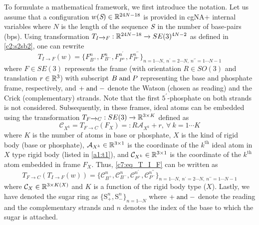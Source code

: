 To formulate a mathematical framework, we first introduce the notation. Let us assume that a configuration $w({\textit{S}}) \in {\mathbb R}^{24N-18}$ is provided in cgNA$+$ internal variables where $N$ is the length of the sequence ${\textit{S}}$ in the number of base-pairs (bps). 
Using transformation $T_{I\xrightarrow{}F} : {\mathbb R}^{24N-18}  \xrightarrow{} SE(3)^{4N-2}$ as defined in \cref{c2:s2sb2}, one can rewrite  
\begin{equation}
T_{I\xrightarrow{}F}(w) = \{F_{B^+}^n,F_{B^-}^n,F_{P^+}^{n^\prime},F_{P^-}^{n^{\prime\prime}}\}_{n=1\cdots N, \ n^\prime=2 \cdots N, \ n^{\prime\prime} = 1 \cdots N-1}
\label{c7:eq_T_I_F}
\end{equation}
where $F \in SE(3)$ represents the frame (with orientation $R \in SO(3)$ and translation $r \in {\mathbb R}^3$) with subscript $B {\;\text{and\;}} P$ representing the base and phosphate frame, respectively, and $+ {\;\text{and\;}} -$ denote the Watson (chosen as reading) and the Crick (complementary) strands.
Note that the first $5^\prime$-phosphate on both strands is not considered.
Subsequently, in these frames, ideal atoms can be embedded using the transformation $T_{F\xrightarrow{}C}  :  SE(3)\xrightarrow{} {\mathbb R}^{3 \times K}$ defined as 
\begin{equation}
\mathcal{C}_{X^k} = T_{F\xrightarrow{}C}(F_X) =: R \mathcal{A}_{X^k} + r, \ \forall \ k = 1 \cdots K
\label{c7:eq_T_F_C}
\end{equation}
where $K$ is the number of atoms in base or phosphate, $X$ is the kind of rigid body (base or phosphate), $\mathcal{A}_{X^k} \in {\mathbb R}^{3 \times 1}$
is the coordinate of the $k^{\text{th}}$ ideal atom in $X$ type rigid body (listed in \cref{a1:t1}), and $\mathcal{C}_{X^k} \in {\mathbb R}^{3 \times 1}$ is the coordinate of the $k^{\text{th}}$ atom embedded in frame $F_X$. 
Thus, \cref{c7:eq_T_I_F} can be written as 
\begin{equation}
T_{F\xrightarrow{}C}(T_{I\xrightarrow{}F}(w)) = \{\mathcal{C}_{B^+}^n,\mathcal{C}_{B^-}^n,\mathcal{C}_{P^+}^{n^\prime},\mathcal{C}_{P^-}^{n^{\prime\prime}}\}_{n=1\cdots N, \ n^\prime=2 \cdots N, \ n^{\prime\prime} = 1 \cdots N-1}
\label{c7:eq_T_I_C}
\end{equation}
where $\mathcal{C}_X \in {\mathbb R}^{3 \times K(X)}$ and $K$ is a function of the rigid body type ($X$).
Lastly, we have denoted the sugar ring as $\{\mathrm{S}_+^n,\mathrm{S}_-^n\}_{n=1\cdots N}$ where $+ {\;\text{and\;}} - $ denote the reading and the complementary strands and $n$ denotes the index of the base to which the sugar is attached.


